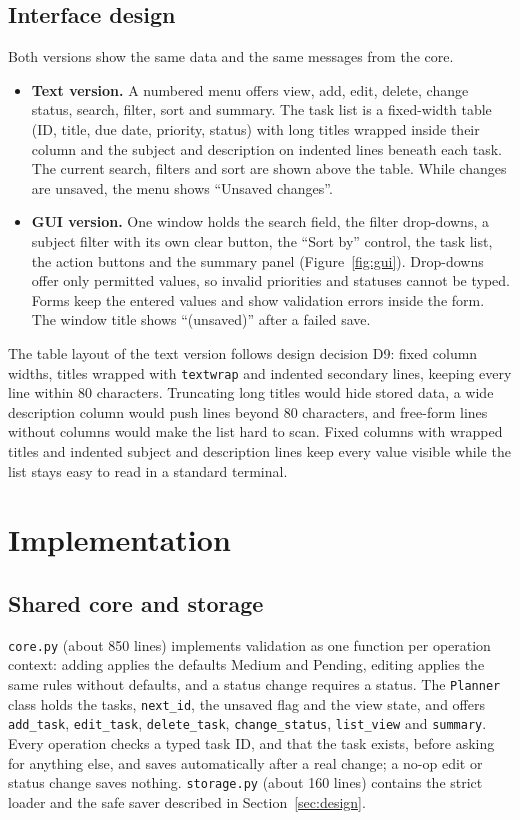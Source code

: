 \documentclass[11pt,a4paper]{article}
\newcommand{\code}[1]{\texttt{#1}}
\begin{document}
\subsection{Interface design}
Both versions show the same data and the same messages from the core.
\begin{itemize}
  \item \textbf{Text version.} A numbered menu offers view, add, edit, delete,
        change status, search, filter, sort and summary. The task list is a
        fixed-width table (ID, title, due date, priority, status) with long
        titles wrapped inside their column and the subject and description
        on indented lines beneath each task. The current search, filters and
        sort are shown above the table. While changes are unsaved, the menu
        shows \enquote{Unsaved changes}.
  \item \textbf{GUI version.} One window holds the search field, the filter
        drop-downs, a subject filter with its own clear button, the
        \enquote{Sort by} control, the task list, the action buttons and the
        summary panel (Figure~\ref{fig:gui}). Drop-downs offer only permitted
        values, so invalid priorities and statuses cannot be typed. Forms keep
        the entered values and show validation errors inside the form. The
        window title shows \enquote{(unsaved)} after a failed save.
\end{itemize}
The table layout of the text version follows design decision D9: fixed
column widths, titles wrapped with \code{textwrap}
\parencite{python-textwrap} and indented secondary lines, keeping every
line within 80 characters. Truncating long titles would hide stored data, a
wide description column would push lines beyond 80 characters, and free-form
lines without columns would make the list hard to scan. Fixed columns with
wrapped titles and indented subject and description lines keep every value
visible while the list stays easy to read in a standard terminal.

\section{Implementation}

\subsection{Shared core and storage}
\code{core.py} (about 850 lines) implements validation as one function per
operation context: adding applies the defaults Medium and Pending, editing
applies the same rules without defaults, and a status change requires a
status. The \code{Planner} class holds the tasks, \code{next\_id}, the unsaved
flag and the view state, and offers \code{add\_task}, \code{edit\_task},
\code{delete\_task}, \code{change\_status}, \code{list\_view} and
\code{summary}. Every operation checks a typed task ID, and that the task
exists, before asking for anything else, and saves automatically after a real
change; a no-op edit or status change saves nothing. \code{storage.py}
(about 160 lines) contains the strict loader and the safe saver described in
Section~\ref{sec:design}.
\end{document}
